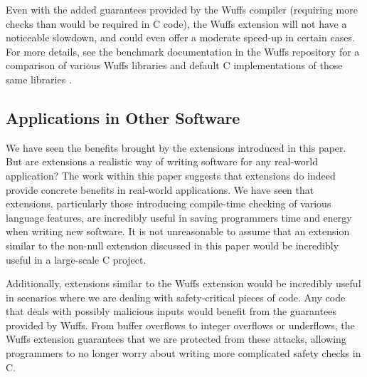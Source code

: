 \documentclass[main.tex]{subfiles}
\begin{document}
Even with the added guarantees provided by the Wuffs compiler (requiring more checks than would be required in C code),
the Wuffs extension will not have a noticeable slowdown, and could even offer a moderate speed-up in certain cases. For
more details, see the benchmark documentation in the Wuffs repository for a comparison of various Wuffs libraries and
default C implementations of those same libraries \cite{wuffs}. 

\subsection{Applications in Other Software}
We have seen the benefits brought by the extensions introduced in this paper. But are extensions a realistic way of writing
software for any real-world application? The work within this paper suggests that extensions do indeed provide concrete
benefits in real-world applications. We have seen that extensions, particularly those introducing compile-time checking of
various language features, are incredibly useful in saving programmers time and energy when writing new software. It is not
unreasonable to assume that an extension similar to the non-null extension discussed in this paper would be incredibly useful
in a large-scale C project.

Additionally, extensions similar to the Wuffs extension would be incredibly useful in scenarios where we are dealing with
safety-critical pieces of code. Any code that deals with possibly malicious inputs would benefit from the guarantees provided
by Wuffs. From buffer overflows to integer overflows or underflows, the Wuffs extension guarantees that we are protected from
these attacks, allowing programmers to no longer worry about writing more complicated safety checks in C.
\end{document}

